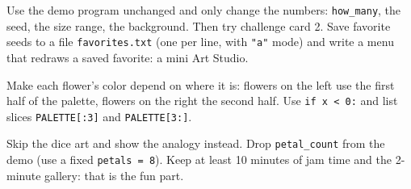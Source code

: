 \begin{differentiation}
\supportpath Use the demo program unchanged and only change the numbers: \texttt{how\_many}, the seed,
the size range, the background. Then try challenge card 2.
\extensionpath Save favorite seeds to a file \texttt{favorites.txt} (one per line, with
\texttt{"a"} mode) and write a menu that redraws a saved favorite: a mini Art Studio.
\end{differentiation}

\begin{stretchchallenge}
Make each flower's color depend on where it is: flowers on the left use the first half of the palette,
flowers on the right the second half. Use \texttt{if x < 0:} and list slices \texttt{PALETTE[:3]} and
\texttt{PALETTE[3:]}.
\end{stretchchallenge}

\begin{teachernote}
Skip the dice art and show the analogy instead. Drop \texttt{petal\_count} from the demo (use a fixed
\texttt{petals = 8}). Keep at least 10 minutes of jam time and the 2-minute gallery: that is the fun part.
\end{teachernote}
